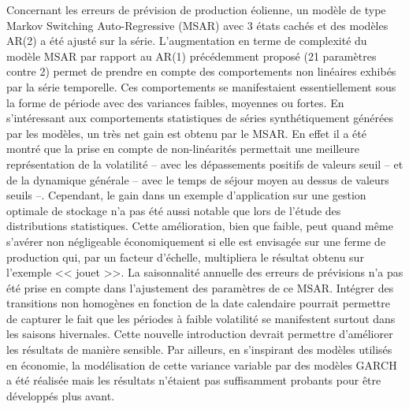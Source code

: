 \documentclass[12pt, french]{report}
\begin{document}
Concernant les erreurs de prévision de production éolienne, un modèle de type Markov Switching Auto-Regressive (MSAR) avec 3 états cachés et des modèles AR(2) a été ajusté sur la série. L'augmentation en terme de complexité du modèle MSAR par rapport au AR(1) précédemment proposé (21 paramètres contre 2) permet de prendre en compte des comportements non linéaires exhibés par la série temporelle. Ces comportements se manifestaient essentiellement sous la forme de période avec des variances faibles, moyennes ou fortes. En s'intéressant aux comportements statistiques de séries synthétiquement générées par les modèles, un très net gain est obtenu par le MSAR. En effet il a été montré que la prise en compte de non-linéarités permettait une meilleure représentation de la volatilité -- avec les dépassements positifs de valeurs seuil -- et de la dynamique générale -- avec le temps de séjour moyen au dessus de valeurs seuils --. Cependant, le gain dans un exemple d'application sur une gestion optimale de stockage n'a pas été aussi notable que lors de l'étude des distributions statistiques. Cette amélioration, bien que faible, peut quand même s'avérer non négligeable économiquement si elle est envisagée sur une ferme de production qui, par un facteur d'échelle, multipliera le résultat obtenu sur l'exemple << jouet >>. La saisonnalité annuelle des erreurs de prévisions n'a pas été prise en compte dans l'ajustement des paramètres de ce MSAR. Intégrer des transitions non homogènes en fonction de la date calendaire pourrait permettre de capturer le fait que les périodes à faible volatilité se manifestent surtout dans les saisons hivernales. Cette nouvelle introduction devrait permettre d'améliorer les résultats de manière sensible. Par ailleurs, en s'inspirant des modèles utilisés en économie, la modélisation de cette variance variable par des modèles GARCH a été réalisée mais les résultats n'étaient pas suffisamment probants pour être développés plus avant.
\end{document}
